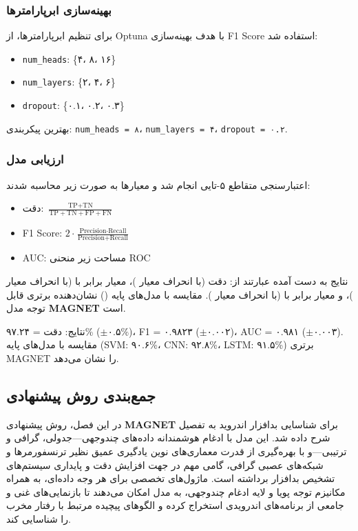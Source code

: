 \subsubsection{بهینه‌سازی ابرپارامترها}
برای تنظیم ابرپارامترها، از Optuna با هدف بهینه‌سازی F1 Score استفاده شد:
\begin{itemize}
    \item \texttt{num\_heads}: \{۴، ۸، ۱۶\}
    \item \texttt{num\_layers}: \{۲، ۴، ۶\}
    \item \texttt{dropout}: \{۰.۱، ۰.۲، ۰.۳\}
\end{itemize}
بهترین پیکربندی: \texttt{num\_heads = ۸}، \texttt{num\_layers = ۴}، \texttt{dropout = ۰.۲}.

\subsubsection{ارزیابی مدل}
اعتبارسنجی متقاطع ۵-تایی انجام شد و معیارها به صورت زیر محاسبه شدند:
\begin{itemize}
    \item دقت: \( \frac{\text{TP} + \text{TN}}{\text{TP} + \text{TN} + \text{FP} + \text{FN}} \)
    \item F1 Score: \( 2 \cdot \frac{\text{Precision} \cdot \text{Recall}}{\text{Precision} + \text{Recall}} \)
    \item AUC: مساحت زیر منحنی ROC
\end{itemize}

نتایج به دست آمده عبارتند از: دقت  (با انحراف معیار )، معیار  برابر با  (با انحراف معیار )، و معیار  برابر با  (با انحراف معیار ). مقایسه با مدل‌های پایه () نشان‌دهنده برتری قابل توجه مدل \textbf{MAGNET} است.

نتایج: دقت = ۹۷.۲۴\% (\( \pm ۰.۵\% \))، F1 = ۰.۹۸۲۳ (\( \pm ۰.۰۰۲ \))، AUC = ۰.۹۸۱ (\( \pm ۰.۰۰۳ \)). مقایسه با مدل‌های پایه (SVM: ۹۰.۶\%، CNN: ۹۲.۸\%، LSTM: ۹۱.۵\%) برتری MAGNET را نشان می‌دهد.

\subsection{جمع‌بندی روش پیشنهادی}
در این فصل، روش پیشنهادی \textbf{MAGNET} برای شناسایی بدافزار اندروید به تفصیل شرح داده شد. این مدل با ادغام هوشمندانه داده‌های چندوجهی—جدولی، گرافی و ترتیبی—و با بهره‌گیری از قدرت معماری‌های نوین یادگیری عمیق نظیر ترنسفورمرها و شبکه‌های عصبی گرافی، گامی مهم در جهت افزایش دقت و پایداری سیستم‌های تشخیص بدافزار برداشته است. ماژول‌های تخصصی برای هر وجه داده‌ای، به همراه مکانیزم توجه پویا و لایه ادغام چندوجهی، به مدل امکان می‌دهند تا بازنمایی‌های غنی و جامعی از برنامه‌های اندرویدی استخراج کرده و الگوهای پیچیده مرتبط با رفتار مخرب را شناسایی کند.

